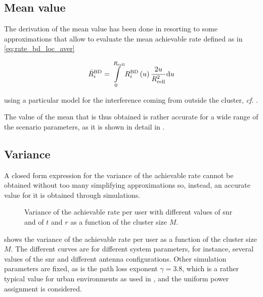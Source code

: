\subsection{Mean value}\label{ssec:stats_mean}

The derivation of the mean value has been done in 
resorting to some approximations that allow to evaluate the mean achievable rate
defined as in \eqref{eq:rate_bd_loc_aver}

\begin{equation} \label{eq:rate_bd_loc_aver_2}
    \bar{R}_i^{\text{BD}} = \int\limits_0^{R_{\text{cell}}} R_i^{\text{BD}}\left(u
    \right) \frac{2u}{R_{\text{cell}}^2} \text{d} u
\end{equation}

\noindent
using a particular model for the interference coming from outside the cluster,
\emph{cf.} .

The value of the mean that is thus obtained is rather accurate for a wide range
of the scenario parameters, as it is shown in detail in .

\subsection{Variance}\label{ssec:stats_variance}

A closed form expression for the variance of the achievable rate cannot be
obtained without too many simplifying approximations so, instead, an accurate
value for it is obtained through simulations.

\begin{figure}[t]
\begin{center}
    \dummybox
\end{center}
\caption{Variance of the achievable rate per user with different values of
\gls{snr} and of $t$ and $r$ as a function of the cluster size $M$.}
\label{fig:rate_variance}
\end{figure}

 shows the variance of the achievable rate per user as a
function of the cluster size $M$. The different curves are for different system
parameters, for instance, several values of the \gls{snr} and different antenna
configurations. Other simulation parameters are fixed, as is the path loss
exponent $\gamma=3.8$, which is a rather typical value for urban environments as
used in \cite{karakayali06}, and the uniform power assignment is considered.

